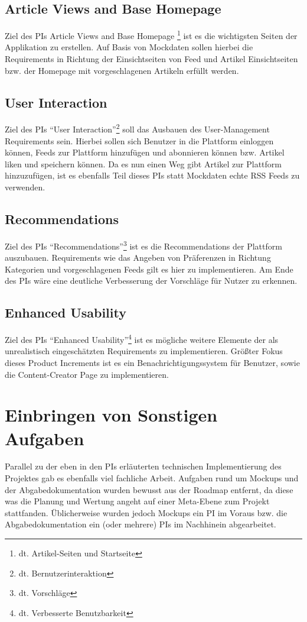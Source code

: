 \subsection{Article Views and Base Homepage}
Ziel des \acp{PI} \glqq Article Views and Base Homepage \grqq \footnote{dt. Artikel-Seiten und Startseite} ist es die wichtigsten Seiten der Applikation zu erstellen.
Auf Basis von Mockdaten sollen hierbei die Requirements in Richtung der Einsichtseiten von Feed und Artikel Einsichtseiten bzw. der Homepage mit vorgeschlagenen Artikeln erfüllt werden.


\subsection{User Interaction}
Ziel des \acp{PI} \enquote{User Interaction}\footnote{dt. Bernutzerinteraktion} soll das Ausbauen des User-Management Requirements sein.
Hierbei sollen sich Benutzer in die Plattform einloggen können, Feeds zur Plattform hinzufügen und abonnieren können bzw. Artikel liken und speichern können.
Da es nun einen Weg gibt Artikel zur Plattform hinzuzufügen, ist es ebenfalls Teil dieses \acp{PI} statt Mockdaten echte RSS Feeds zu verwenden.

\subsection{Recommendations}
Ziel des \acp{PI} \enquote{Recommendations}\footnote{dt. Vorschläge} ist es die Recommendations der Plattform auszubauen.
Requirements wie das Angeben von Präferenzen in Richtung Kategorien und vorgeschlagenen Feeds gilt es hier zu implementieren.
Am Ende des \acp{PI} wäre eine deutliche Verbesserung der Vorschläge für Nutzer zu erkennen.

\subsection{Enhanced Usability}
Ziel des \acp{PI} \enquote{Enhanced Usability}\footnote{dt. Verbesserte Benutzbarkeit} ist es mögliche weitere Elemente der als unrealistisch eingeschätzten Requirements zu implementieren.
Größter Fokus dieses Product Increments ist es ein Benachrichtigungssystem für Benutzer, sowie die Content-Creator Page zu implementieren.

\section{Einbringen von Sonstigen Aufgaben}
Parallel zu der eben in den \acp{PI} erläuterten technischen Implementierung des Projektes gab es ebenfalls viel fachliche Arbeit.
Aufgaben rund um Mockups und der Abgabedokumentation wurden bewusst aus der Roadmap entfernt, da diese was die Planung und Wertung angeht auf einer Meta-Ebene zum Projekt stattfanden.
Üblicherweise wurden jedoch Mockups ein \ac{PI} im Voraus bzw. die Abgabedokumentation ein (oder mehrere) \acp{PI} im Nachhinein abgearbeitet.
